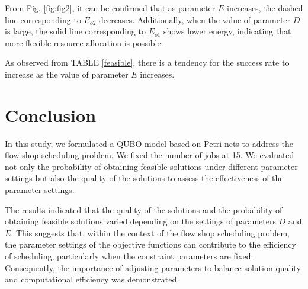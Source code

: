 \documentclass[conference]{IEEEtran}
\begin{document}


From Fig. \ref{fig:fig2}, it can be confirmed that as parameter $E$ increases, the dashed line corresponding to $E_{o2}$ decreases. Additionally, when the value of parameter $D$ is large, the solid line corresponding to $E_{o1}$ shows lower energy, indicating that more flexible resource allocation is possible.

As observed from TABLE \ref{feasible}, there is a tendency for the success rate to increase as the value of parameter $E$ increases.




\section{Conclusion}
In this study, we formulated a QUBO model based on Petri nets to address the flow shop scheduling problem. We fixed the number of jobs at 15. We evaluated not only the probability of obtaining feasible solutions under different parameter settings but also the quality of the solutions to assess the effectiveness of the parameter settings.

The results indicated that the quality of the solutions and the probability of obtaining feasible solutions varied depending on the settings of parameters $D$ and $E$. This suggests that, within the context of the flow shop scheduling problem, the parameter settings of the objective functions can contribute to the efficiency of scheduling, particularly when the constraint parameters are fixed. Consequently, the importance of adjusting parameters to balance solution quality and computational efficiency was demonstrated.




\end{document}
